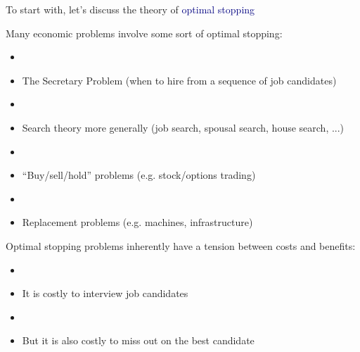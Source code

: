\documentclass[aspectratio=169]{beamer}
\begin{document}
\begin{frame}

To start with, let's discuss the theory of \textcolor{navy}{optimal stopping}

\bigskip{}


\end{frame}

\begin{frame}

Many economic problems involve some sort of optimal stopping:

\begin{itemize}
\item[]
\item<2-> The Secretary Problem (when to hire from a sequence of job candidates)
\item[]
\item<3-> Search theory more generally (job search, spousal search, house search, ...)
\item[]
\item<4-> ``Buy/sell/hold'' problems (e.g. stock/options trading)
\item[]
\item<5-> Replacement problems (e.g. machines, infrastructure)
\end{itemize}

\end{frame}




\begin{frame}

Optimal stopping problems inherently have a tension between costs and benefits:

\begin{itemize}
\item[]
\item<2-> It is costly to interview job candidates
\item[]
\item<3-> But it is also costly to miss out on the best candidate
\end{itemize}

\end{frame}
\end{document}

